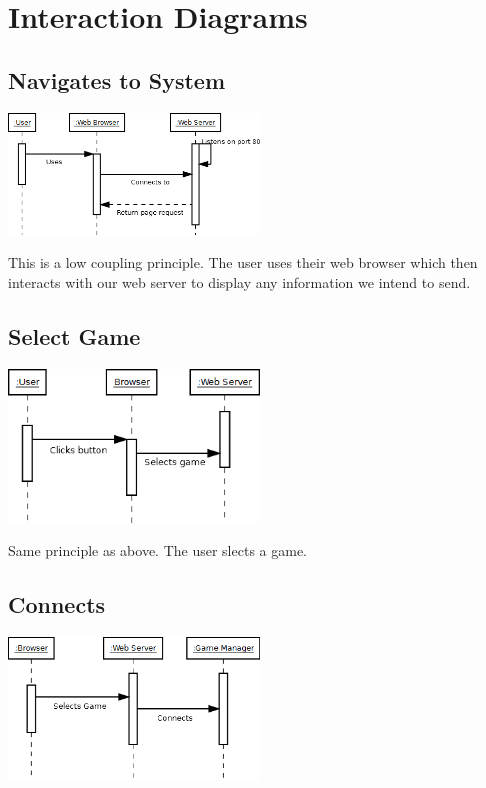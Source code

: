 %

\section{Interaction Diagrams}
	
	\subsection{Navigates to System}
	\includegraphics[width=0.50\textwidth]{./Interact1.png}
	
	This is a low coupling principle. The user uses their web browser which then interacts with our web server to display any information we intend to send.
	
	\subsection{Select Game}
	\includegraphics[width=0.50\textwidth]{./Interact2.png}
	
	Same principle as above. The user slects a game.
	
	\subsection{Connects}
	\includegraphics[width=0.50\textwidth]{./Interact3.png}
	
